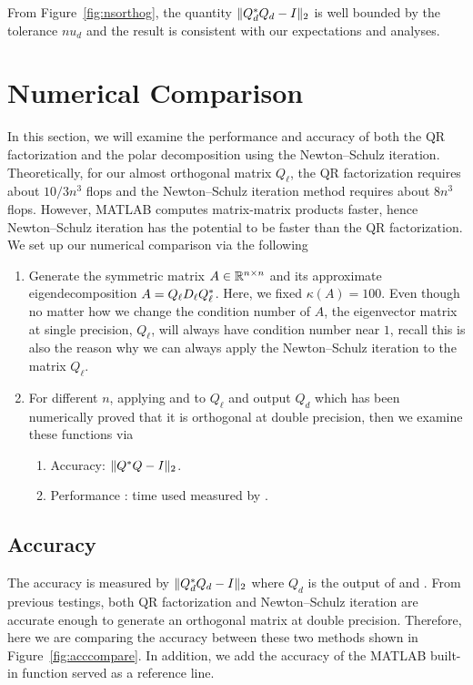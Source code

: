 From Figure~\ref{fig:nsorthog}, the quantity $\|{Q_d^* Q_d - I}\|_2$ is well bounded by the tolerance $nu_d$ and the result is consistent with our expectations and analyses.




\section{Numerical Comparison}

In this section, we will examine the performance and accuracy of both the QR factorization and the polar decomposition using the Newton--Schulz iteration. Theoretically, for our almost orthogonal matrix $Q_\ell$, the QR factorization requires about $10/3n^3$ flops and the Newton--Schulz iteration method requires about $8n^3$ flops. However, MATLAB computes matrix-matrix products faster, hence Newton--Schulz iteration has the potential to be faster than the QR factorization. We set up our numerical comparison via the following 
\begin{enumerate}
    \item Generate the symmetric matrix $A\in\mathbb{R}^{n\times n}$ and its approximate eigendecomposition $A = Q_\ell D_\ell Q_\ell^*$. Here, we fixed $\kappa(A) = 100$. Even though no matter how we change the condition number of $A$, the eigenvector matrix at single precision, $Q_\ell$, will always have condition number near $1$, recall this is also the reason why we can always apply the Newton--Schulz iteration to the matrix $Q_\ell$.
    \item For different $n$, applying  and  to $Q_\ell$ and output $Q_d$ which has been numerically proved that it is orthogonal at double precision, then we examine these functions via
        \begin{enumerate}
            \item Accuracy: $\|{Q^* Q - I}\|_2$.
            \item Performance : time used measured by .
        \end{enumerate}
\end{enumerate}

\subsection{Accuracy}\label{sec:Accuracy}

The accuracy is measured by $\|{Q_d^* Q_d - I}\|_2$ where $Q_d$ is the output of  and . From previous testings, both QR factorization and Newton--Schulz iteration are accurate enough to generate an orthogonal matrix at double precision. Therefore, here we are comparing the accuracy between these two methods shown in Figure~\ref{fig:acccompare}. In addition, we add the accuracy of the MATLAB built-in function  served as a reference line.

